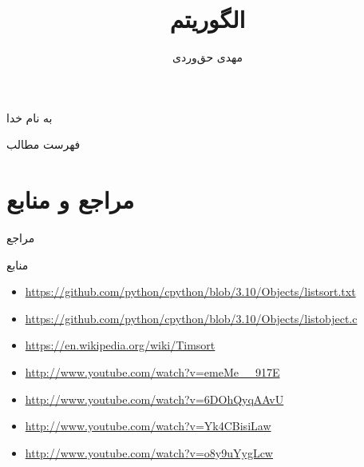 \documentclass[aspectratio=169, dvipsnames, svgnames, x11names]{beamer}
\title{الگوریتم \lr{Timsort}}
\author{
مهدی حق‌وردی
}
\institute{
\\
\texttt{[image: logos/ui.png]}}
\date{}
\begin{document}
\begin{frame}[plain]
\begin{center}
به نام خدا
\end{center}

\maketitle

\end{frame}

\setcounter{framenumber}{0}
\raggedleft

\begin{frame}{فهرست مطالب}
\begin{flushright}
\tableofcontents
\end{flushright}
\end{frame}










\section{مراجع و منابع}
\begin{frame}{مراجع}
\begin{latin}


\end{latin}
\end{frame}

\begin{frame}{منابع}
\begin{latin}
\begin{itemize}
\item \url{https://github.com/python/cpython/blob/3.10/Objects/listsort.txt}
\item \url{https://github.com/python/cpython/blob/3.10/Objects/listobject.c}
\item \url{https://en.wikipedia.org/wiki/Timsort}
\item \url{http://www.youtube.com/watch?v=emeMe__917E}
\item \url{http://www.youtube.com/watch?v=6DOhQyqAAvU}
\item \url{http://www.youtube.com/watch?v=Yk4CBisiLaw}
\item \url{http://www.youtube.com/watch?v=o8y9uYygLcw}
\end{itemize}
\end{latin}
\end{frame}
\end{document}
